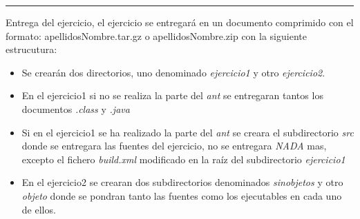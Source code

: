 \documentclass[addpoints,12pt]{exam}
\begin{document}
\vspace{0,5cm}
\hrule
\vspace{0,5cm}
Entrega del ejercicio, el ejercicio se entregará en un documento comprimido con el formato: apellidosNombre.tar.gz o apellidosNombre.zip con la siguiente estrucutura:
\begin{itemize}
\item Se crearán dos directorios, uno denominado \emph{ejercicio1} y otro \emph{ejercicio2}.
\item En el ejercicio1 si no se realiza la parte del \emph{ant} se entregaran tantos los documentos \emph{.class} y \emph{.java}
\item Si en el ejercicio1 se ha realizado la parte del \emph{ant} se creara el subdirectorio \emph{src} donde se entregara las fuentes del ejercicio, no se entregara \emph{NADA} mas, excepto el fichero \emph{build.xml} modificado en la raíz del subdirectorio \emph{ejercicio1}
\item En el ejercicio2 se crearan dos subdirectorios denominados \emph{sinobjetos} y otro \emph{objeto} donde se pondran tanto las fuentes como los ejecutables en cada uno de ellos.
\end{itemize}
\end{document}
